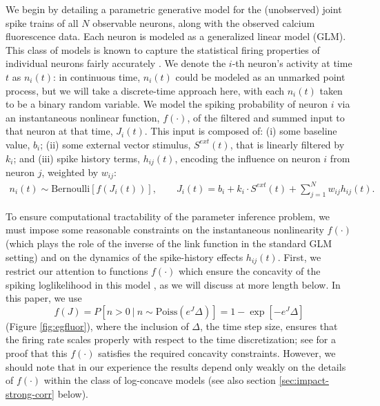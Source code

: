 \documentclass[aoas,preprint]{imsart}
\newcommand{\w}{w}
\begin{document}
We begin by detailing a parametric generative model for the
(unobserved) joint spike trains of all $N$ observable neurons, along
with the observed calcium fluorescence data. Each neuron is modeled as
a generalized linear model (GLM). This class of models is known to
capture the statistical firing properties of individual neurons fairly
accurately
\cite{BRIL88,CSK88,BRIL92,PG00,PAN03d,PAN04c,Rigat06,TRUC05,NYK06,KP06,PILL07,Vidne08,Stevenson2009}. We
denote the $i$-th neuron's activity at time $t$ as $n_i(t)$: in
continuous time, $n_i(t)$ could be modeled as an unmarked point
process, but we will take a discrete-time approach here, with each
$n_i(t)$ taken to be a binary random variable. We model the spiking
probability of neuron $i$ via an instantaneous nonlinear function,
$f(\cdot)$, of the filtered and summed input to that neuron at that
time, $J_i(t)$. This input is composed of: (i) some baseline value,
$b_i$; (ii) some external vector stimulus, $S^{ext}(t)$, that is
linearly filtered by $k_i$; and (iii) spike history terms,
$h_{ij}(t)$, encoding the influence on neuron $i$ from neuron $j$,
weighted by $\w_{ij}$:
\begin{equation} \label{eqn:glm:definition}
\begin{array}{l}
n_i(t) \sim \text{Bernoulli}\left[f\left(J_i(t) \right) \right], \qquad
J_i(t)=b_i+k_i\cdot S^{ext}(t)+\sum \limits_{j=1}^{N} \w_{ij} h_{ij}(t).
\end{array}
\end{equation}

To ensure computational tractability of the parameter inference
problem, we must impose some reasonable constraints on the
instantaneous nonlinearity $f(\cdot)$ (which plays the role of the
inverse of the link function in the standard GLM setting) and on the
dynamics of the spike-history effects $h_{ij}(t)$. First, we restrict
our attention to functions $f(\cdot)$ which ensure the concavity of
the spiking loglikelihood in this model \cite{PAN04c,Escola07}, as we
will discuss at more length below. In this paper, we use
\begin{equation}
f(J) = P\left[n>0 ~|~ n \sim \text{Poiss}\left(e^J\Delta\right)\right] = 1 - \exp[-e^J \Delta]
\end{equation}
(Figure \ref{fig:egfluor}), where the inclusion of $\Delta$, the time
step size, ensures that the firing rate scales properly with respect
to the time discretization; see \cite{Escola07} for a proof that this
$f(\cdot)$ satisfies the required concavity constraints. However, we
should note that in our experience the results depend only weakly on
the details of $f(\cdot)$ within the class of log-concave models
\cite{LD89,PAN04c} (see also section \ref{sec:impact-strong-corr}
below).
\end{document}
